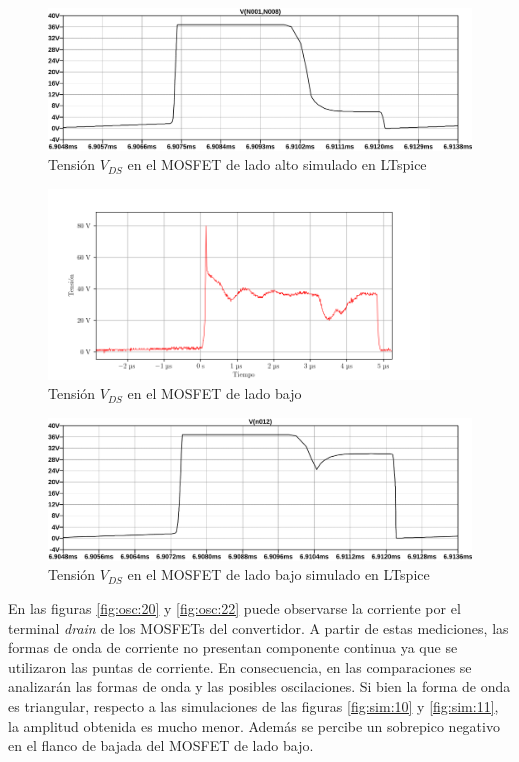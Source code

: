 \begin{figure}[H]
    \centering
    \includegraphics[width=\textwidth]{images/sim/16.pdf}
    \caption{Tensión $V_{DS}$ en el MOSFET de lado alto simulado en LTspice}
    \label{fig:vds_simulation_high}
\end{figure}

\begin{figure}[H]
    \centering
    \includegraphics[width=0.9\textwidth]{images/capturas-osciloscopio/17-11-2022/36.png}
    \caption{Tensión $V_{DS}$ en el MOSFET de lado bajo}
    \label{fig:vds_low}
\end{figure}

\begin{figure}[H]
    \centering
    \includegraphics[width=\textwidth]{images/sim/18.pdf}
    \caption{Tensión $V_{DS}$ en el MOSFET de lado bajo simulado en LTspice}
    \label{fig:vds_simulation_low}
\end{figure}


En las figuras \ref{fig:osc:20} y \ref{fig:osc:22} puede observarse la corriente por el terminal \textit{drain} de los MOSFETs del convertidor.
A partir de estas mediciones, las formas de onda de corriente no presentan componente continua ya que se utilizaron las puntas de corriente. En consecuencia, en las comparaciones se analizarán las formas de onda y las posibles oscilaciones.  
Si bien la forma de onda es triangular, respecto a las simulaciones de las figuras \ref{fig:sim:10} y \ref{fig:sim:11}, la amplitud obtenida es mucho menor. 
Además se percibe un sobrepico negativo en el flanco de bajada del MOSFET de lado bajo. 

